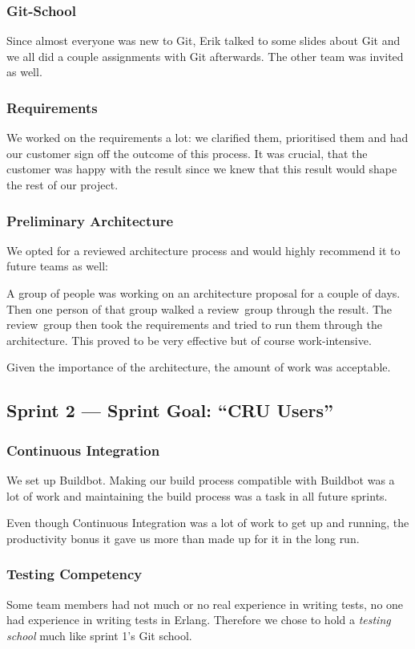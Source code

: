 \documentclass[11pt,a4paper]{report}
\begin{document}
\subsubsection{Git-School}
Since almost everyone was new to Git, Erik talked to some slides about Git and
we all did a couple assignments with Git afterwards.
The other team was invited as well.
\subsubsection{Requirements}
We worked on the requirements a lot: we clarified them, prioritised them and had
our customer sign off the outcome of this process. It was crucial, that the
customer was happy with the result since we knew that this result would shape
the rest of our project.
\subsubsection{Preliminary Architecture}
We opted for a reviewed architecture process and would highly recommend it to
future teams as well:

A group of people was working on an architecture proposal for a couple of days.
Then one person of that group walked a review~group through the result. The
review~group then took the requirements and tried to run them through the
architecture. This proved to be very effective but of course work-intensive.

Given the importance of the architecture, the amount of work was acceptable.
\subsection*{Sprint 2 --- Sprint Goal: ``CRU Users''}
\subsubsection{Continuous Integration}
We set up Buildbot. Making our build process compatible with Buildbot was a lot
of work and maintaining the build process was a task in all future sprints.

Even though Continuous Integration was a lot of work to get up and running, the
productivity bonus it gave us more than made up for it in the long run.

\subsubsection{Testing Competency}
Some team members had not much or no real experience in writing tests, no one
had experience in writing tests in Erlang. Therefore we chose to hold a
{\em testing school\/} much like sprint 1's Git school.
\end{document}
